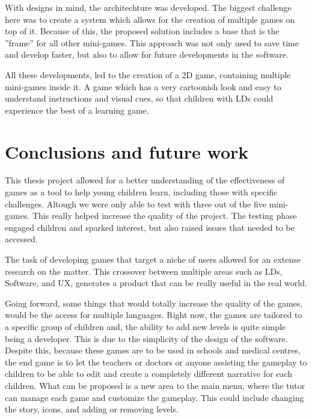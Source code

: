 With designs in mind, the architechture was developed. The biggest challenge here was to create a system which allows for the creation of multiple games on top of it. Because of this, the proposed solution includes a base that is the ''frame'' for all other mini-games. This approach was not only used to save time and develop faster, but also to allow for future developments in the software. 


All these developments, led to the creation of a 2D game, containing multiple mini-games inside it. A game which has a very cartoonish look and easy to understand instructions and visual cues, so that children with LDs could experience the best of a learning game.


\newpage
\section{Conclusions and future work}

This thesis project allowed for a better understanding of the effectiveness of games as a tool to help young children learn, including those with specific challenges. Altough we were only able to test with three out of the five mini-games. This really helped increase the quality of the project. The testing phase engaged children and sparked interest, but also raised issues that needed to be accessed.

The task of developing games that target a niche of users allowed for an extense research on the matter. This crossover between multiple areas such as LDs, Software, and UX, generates a product that can be really useful in the real world. 

Going forward, some things that would totally increase the quality of the games, would be the access for multiple languages. Right now, the games are tailored to a specific group of children and, the ability to add new levels is quite simple being a developer. This is due to the simplicity of the design of the software. Despite this, because these games are to be used in schools and medical centres, the end game is to let the teachers or doctors or anyone assisting the gameplay to children to be able to edit and create a completely different narrative for each children. What can be proposed is a new area to the main menu, where the tutor can manage each game and customize the gameplay. This could include changing the story, icons, and adding or removing levels.

